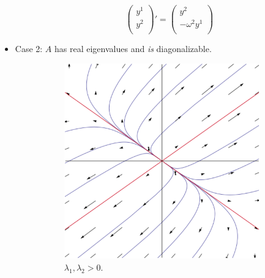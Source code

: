 \documentclass[../notes.tex]{subfiles}
\begin{document}
\begin{itemize}
\begin{itemize}
        \begin{equation*}
            \begin{pmatrix}
                y^1\\
                y^2\\
            \end{pmatrix}'
            =
            \begin{pmatrix}
                y^2\\
                -\omega^2y^1\\
            \end{pmatrix}
        \end{equation*}
    \end{itemize}
    \item Case 2: $A$ has real eigenvalues and \emph{is} diagonalizable.
    \begin{figure}[h!]
        \centering
        \begin{subfigure}[b]{0.32\linewidth}
            \centering
            \includegraphics[width=0.8\linewidth]{../ExtFiles/planarRealDiaga.png}
            \caption{$\lambda_1,\lambda_2>0$.}
            \label{fig:planarRealDiaga}
        \end{subfigure}
        \begin{subfigure}[b]{0.32\linewidth}
            \centering

\end{subfigure}
\end{figure}
\end{itemize}
\end{document}
